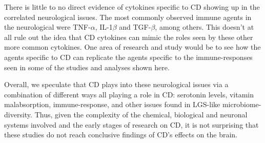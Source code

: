 \documentclass{article}
\begin{document}
There is little to no direct evidence of cytokines specific to CD showing up in the correlated neurological issues. The most commonly observed immune agents in the neurological were TNF-$\alpha$, IL-1$\beta$ and TGF-$\beta$, among others. This doesn't at all rule out the idea that CD cytokines can mimic the roles seen by these other more common cytokines. One area of research and study would be to see how the agents specific to CD can replicate the  agents specific to the immune-responses seen in some of the studies and analyses shown here.

Overall, we speculate that CD plays into these neurological issues via a combination of different ways all playing a role in CD: serotonin levels, vitamin malabsorption, immune-response, and other issues found in LGS-like microbiome-diversity. Thus, given the complexity of the chemical, biological and neuronal systems involved and the early stages of research on CD, it is not surprising that these studies do not reach conclusive findings of CD's effects on the brain. 


\end{document}

